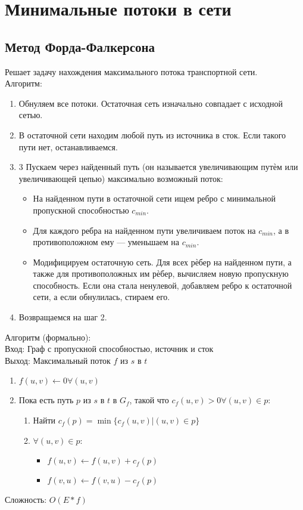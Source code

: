 \documentclass[a4paper]{article}
\begin{document}
\section{Минимальные потоки в сети}
\subsection{Метод Форда-Фалкерсона}
Решает задачу нахождения максимального потока транспортной сети. \\
Алгоритм:
\begin{enumerate}
	\item Обнуляем все потоки. Остаточная сеть изначально совпадает с исходной сетью.
	\item В остаточной сети находим любой путь из источника в сток. Если такого пути нет, останавливаемся.
	\item 3 Пускаем через найденный путь (он называется увеличивающим путѐм или увеличивающей цепью) максимально возможный поток:
	\begin{itemize}
	 	\item На найденном пути в остаточной сети ищем ребро с минимальной пропускной способностью $c_{min}$.
		\item Для каждого ребра на найденном пути увеличиваем поток на $c_{min}$, а в противоположном ему — уменьшаем на $c_{min}$.
		\item Модифицируем остаточную сеть. Для всех рѐбер на найденном пути, а также для противоположных им рѐбер, вычисляем новую пропускную способность. Если она стала ненулевой, добавляем ребро к остаточной сети, а если обнулилась, стираем его.
	\end{itemize}
	\item Возвращаемся на шаг 2.
\end{enumerate}
Алгоритм (формально):\\
Вход: Граф с пропускной способностью, источник и сток\\
Выход: Максимальный поток $f$ из $s$ в $t$\\
\begin{enumerate}
	\item $f(u,v) \leftarrow 0 \forall (u,v)$
	\item Пока есть путь $p$ из $s$ в $t$ в $G_f$, такой что $c_f(u,v)>0 \forall (u,v) \in p$:
	\begin{enumerate}
		\item Найти $c_f(p) = \min\{c_f(u,v)|(u,v) \in p\}$
		\item $\forall (u,v) \in p$:
		\begin{itemize}
			\item $f(u,v) \leftarrow f(u,v) + c_f(p)$
			\item $f(v,u) \leftarrow f(v,u) - c_f(p)$
		\end{itemize}
	\end{enumerate}
\end{enumerate}
Сложность: $O(E*f)$
\end{document}
